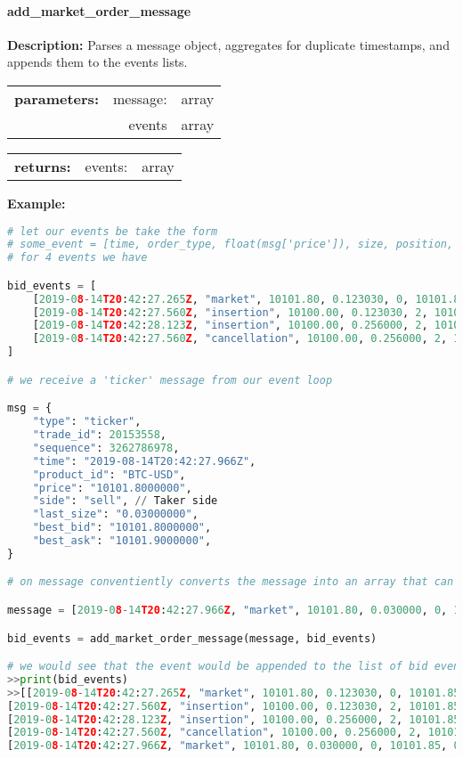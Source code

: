 \paragraph{add\_market\_order\_message}
\hfill\break
\textbf{Description:} Parses a message object, aggregates for duplicate timestamps, and appends them to the events lists. 

\begin{tabular}{r r l }
	\textbf{parameters:}	& message: & array\\
	&events& array\\ 
\end{tabular}

\begin{tabular}{r r l}
	\textbf{returns:} & events: & array\\
\end{tabular}

\textbf{Example:}
\begin{lstlisting}[language=Python]
# let our events be take the form
# some_event = [time, order_type, float(msg['price']), size, position, mid_price, spread].
# for 4 events we have

bid_events = [
	[2019-08-14T20:42:27.265Z, "market", 10101.80, 0.123030, 0, 10101.85, 0.10],
	[2019-08-14T20:42:27.560Z, "insertion", 10100.00, 0.123030, 2, 10101.85, 0.10],
	[2019-08-14T20:42:28.123Z, "insertion", 10100.00, 0.256000, 2, 10101.85, 0.10],
	[2019-08-14T20:42:27.560Z, "cancellation", 10100.00, 0.256000, 2, 10101.85, 0.10]
]

# we receive a 'ticker' message from our event loop

msg = {
	"type": "ticker",
	"trade_id": 20153558,
	"sequence": 3262786978,
	"time": "2019-08-14T20:42:27.966Z",
	"product_id": "BTC-USD",
	"price": "10101.8000000",
	"side": "sell", // Taker side
	"last_size": "0.03000000",
	"best_bid": "10101.8000000",
	"best_ask": "10101.9000000",
}

# on message conventiently converts the message into an array that can be used by add_market_order_message

message = [2019-08-14T20:42:27.966Z, "market", 10101.80, 0.030000, 0, 10101.85, 0.10]

bid_events = add_market_order_message(message, bid_events)

# we would see that the event would be appended to the list of bid events
>>print(bid_events)
>>[[2019-08-14T20:42:27.265Z, "market", 10101.80, 0.123030, 0, 10101.85, 0.10],
[2019-08-14T20:42:27.560Z, "insertion", 10100.00, 0.123030, 2, 10101.85, 0.10],
[2019-08-14T20:42:28.123Z, "insertion", 10100.00, 0.256000, 2, 10101.85, 0.10],
[2019-08-14T20:42:27.560Z, "cancellation", 10100.00, 0.256000, 2, 10101.85, 0.10],
[2019-08-14T20:42:27.966Z, "market", 10101.80, 0.030000, 0, 10101.85, 0.10]] #new msg!
\end{lstlisting}

